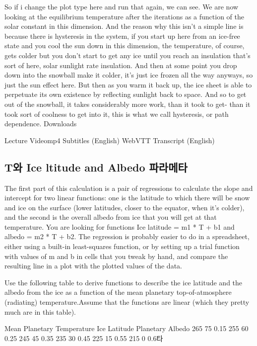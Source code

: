 {So if i change the plot type here and run that again, we can see. We are now looking at the equilibrium temperature after the iterations as a function of the solar constant in this dimension. And the reason why this isn't a simple line is because there is hysteresis in the system, if you start up here from an ice-free state and you cool the sun down in this dimension, the temperature, of course, gets colder but you don't start to get any ice until you reach an insulation that's sort of here, solar sunlight rate insulation. And then at some point you drop down into the snowball make it colder, it's just ice frozen all the way anyways, so just the sun effect here. But then as you warm it back up, the ice sheet is able to perpetuate its own existence by reflecting sunlight back to space. And so to get out of the snowball, it takes considerably more work, than it took to get- than it took sort of coolness to get into it, this is what we call hysteresis, or path dependence. 
Downloads

Lecture Videomp4
Subtitles (English)
WebVTT
Transcript (English)


\subsection{T와 Ice ltitude and Albedo 파라메타}\index{}

The first part of this calculation is a pair of regressions to calculate the slope and intercept for two linear functions: one is the latitude to which there will be snow and ice on the surface (lower latitudes, closer to the equator, when it’s colder), and the second is the overall albedo from ice that you will get at that temperature. You are looking for functions Ice latitude = m1 * T + b1 and albedo = m2 * T + b2. The regression is probably easier to do in a spreadsheet, either using a built-in least-squares function, or by setting up a trial function with values of m and b in cells that you tweak by hand, and compare the resulting line in a plot with the plotted values of the data.

Use the following table to derive functions to describe the ice latitude and the albedo from the ice as a function of the mean planetary top-of-atmosphere (radiating) temperature.Assume that the functions are linear (which they pretty much are in this table).

Mean Planetary Temperature	Ice Latitude	Planetary Albedo
265	75	0.15
255	60	0.25
245	45	0.35
235	30	0.45
225	15	0.55
215	0	0.6타

}
